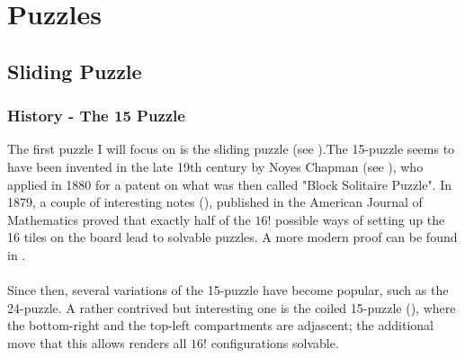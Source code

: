 
\chapter{Puzzles} %

\label{sec:Puzzles} %

\section{Sliding Puzzle}


\subsection{History - The 15 Puzzle}


The first puzzle I will focus on is the sliding puzzle (see \cite{SlidingPuzzleWiki}).The 15-puzzle seems to have been invented in the late 19th century by Noyes Chapman (see \cite{SlidingPuzzleWolfram}), who applied in 1880 for a patent on what was then called "Block Solitaire Puzzle". In 1879, a couple of interesting notes (\cite{Johnson1879}), published in the American Journal of Mathematics proved that exactly half of the $16!$ possible ways of setting up the 16 tiles on the board lead to solvable puzzles. A more modern proof can be found in \cite{Archer1999}.
\\
\\
Since then, several variations of the 15-puzzle have become popular, such as the 24-puzzle. A rather contrived but interesting one is the coiled 15-puzzle (\cite{Coiled15Puzzle}), where the bottom-right and the top-left compartments are adjascent; the additional move that this allows renders all $16!$ configurations solvable. 



